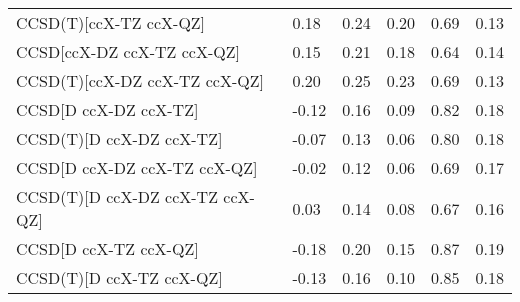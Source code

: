 \begin{table}
\begin{tabular}{l l l l l l }
    CCSD(T)[ccX-TZ ccX-QZ] & 0.18 & 0.24 & 0.20 & 0.69 & 0.13 \\ 
    CCSD[ccX-DZ ccX-TZ ccX-QZ] & 0.15 & 0.21 & 0.18 & 0.64 & 0.14 \\ 
    CCSD(T)[ccX-DZ ccX-TZ ccX-QZ] & 0.20 & 0.25 & 0.23 & 0.69 & 0.13 \\ 
    CCSD[D ccX-DZ ccX-TZ] & -0.12 & 0.16 & 0.09 & 0.82 & 0.18 \\ 
    CCSD(T)[D ccX-DZ ccX-TZ] & -0.07 & 0.13 & 0.06 & 0.80 & 0.18 \\ 
    CCSD[D ccX-DZ ccX-TZ ccX-QZ] & -0.02 & 0.12 & 0.06 & 0.69 & 0.17 \\ 
    CCSD(T)[D ccX-DZ ccX-TZ ccX-QZ] & 0.03 & 0.14 & 0.08 & 0.67 & 0.16 \\ 
    CCSD[D ccX-TZ ccX-QZ] & -0.18 & 0.20 & 0.15 & 0.87 & 0.19 \\ 
    CCSD(T)[D ccX-TZ ccX-QZ] & -0.13 & 0.16 & 0.10 & 0.85 & 0.18 \\ 
    \bottomrule
  \end{tabular}
\end{table}
